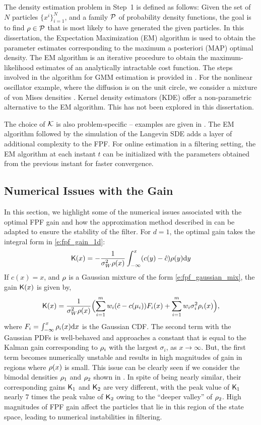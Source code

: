 The density estimation problem in Step~1 is defined as follows: Given the set of $N$ particles $\{x^i\}_{i=1}^N$, and a family ${\cal P} $ of probability density functions,  the goal is to find $\rho \in {\cal P} $ that is most likely to have generated the given particles.  In this dissertation, the Expectation Maximization (EM) algorithm is used to obtain the parameter estimates corresponding to the maximum a posteriori (MAP) optimal density. The EM algorithm is an iterative procedure to obtain the maximum-likelihood estimates of an analytically intractable cost function. The steps involved in the algorithm for GMM estimation is provided in . For the nonlinear oscillator example, where the diffusion is on the unit circle, we consider a mixture of von Mises densities \cite{haspea00}. Kernel density estimators (KDE) offer a non-parametric alternative to the EM algorithm. This has not been explored in this dissertation. 

The choice of ${\cal K}$ is also problem-specific -- examples are given in . The EM algorithm followed by the simulation of the Langevin SDE adds a layer of additional complexity to the FPF. For online estimation in a filtering setting, the EM algorithm at each instant $t$ can be initialized with the parameters obtained from the previous instant for faster convergence.   

\subsection{Numerical Issues with the Gain}
\label{s:fpf_numerical}
In this section, we highlight some of the numerical issues associated with the optimal FPF gain and how the approximation method described in  can be adapted to ensure the stability of the filter. For $d=1$, the optimal gain takes the integral form in \eqref{e:fpf_gain_1d}:
\[
\text{\sf K}(x) = - \frac{1}{\sigma_W^2 \rho(x)} \int_{-\infty}^{x} (c(y) - \hat{c}) \rho(y) \text{d} y
\]
If $c(x) = x$, and $\rho$ is a Gaussian mixture of the form \eqref{e:fpf_gaussian_mix}, the gain $\text{\sf K}(x)$ is given by,
\begin{equation}
\kFPF(x) = \frac{1}{\sigma^2_W \pr(x)} \Bigl( \sum_{i=1}^m w_i (\hac - c(\mu_i)) F_i(x) + \sum_{i=1}^m w_i\sigma^2_i \pr_i(x)\Bigr),
\label{e:fpf_gain_gmm}
\end{equation}
where $F_i = \int_{-\infty}^{x} \rho_i(x) \text{d} x$ is the Gaussian CDF. The second term with the Gaussian PDFs is well-behaved and approaches a constant that is equal to the Kalman gain corresponding to $\rho_i$ with the largest $\sigma_i$, as $x \to \infty$. But, the first term becomes numerically unstable and results in high magnitudes of gain in regions where $\rho(x)$ is small. This issue can be clearly seen if we consider the bimodal densities $\rho_1$ and $\rho_2$ shown in . In spite of being nearly similar, their corresponding gains $\text{\sf K}_1$ and $\text{\sf K}_2$ are very different, with the peak value of $\text{\sf K}_1$ nearly $7$ times the peak value of $\text{\sf K}_2$ owing to the ``deeper valley'' of $\rho_2$. High magnitudes of FPF gain affect the particles that lie in this region of the state space, leading to numerical instabilities in filtering.

